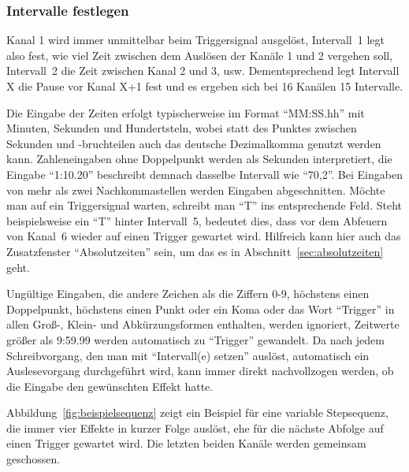 \documentclass[paper=a4, open=any, numbers=noenddot]{scrbook}
\begin{document}
				\subsubsection*{Intervalle festlegen}

					Kanal 1 wird immer unmittelbar beim Triggersignal ausgelöst, Intervall~1 legt also fest, wie viel Zeit zwischen dem Auslösen der Kanäle 1 und 2 vergehen soll, Intervall~2 die Zeit zwischen Kanal 2 und 3, usw. Dementsprechend legt Intervall X die Pause vor Kanal X+1 fest und es ergeben sich bei 16 Kanälen 15 Intervalle.

					Die Eingabe der Zeiten erfolgt typischerweise im Format \enquote{MM:SS.hh} mit Minuten, Sekunden und Hundertsteln, wobei statt des Punktes zwischen Sekunden und -bruchteilen auch das deutsche Dezimalkomma genutzt werden kann. Zahleneingaben ohne Doppelpunkt werden als Sekunden interpretiert, die Eingabe \enquote{1:10.20} beschreibt demnach dasselbe Intervall wie \enquote{70,2}. Bei Eingaben von mehr als zwei Nachkommastellen werden Eingaben abgeschnitten. Möchte man auf ein Triggersignal warten, schreibt man \enquote{T} ins entsprechende Feld. Steht beispielsweise ein \enquote{T} hinter Intervall~5, bedeutet dies, dass vor dem Abfeuern von Kanal~6 wieder auf einen Trigger gewartet wird. Hilfreich kann hier auch das Zusatzfenster \enquote{Absolutzeiten} sein, um das es in Abschnitt~\ref{sec:absolutzeiten} geht.

					Ungültige Eingaben, die andere Zeichen als die Ziffern 0-9, höchstens einen Doppelpunkt, höchstens einen Punkt oder ein Koma oder das Wort \enquote{Trigger} in allen Groß-, Klein- und Abkürzungsformen enthalten, werden ignoriert, Zeitwerte größer als 9:59.99 werden automatisch zu \enquote{Trigger} gewandelt. Da nach jedem Schreibvorgang, den man mit \enquote{Intervall(e) setzen} auslöst, automatisch ein Auslesevorgang durchgeführt wird, kann immer direkt nachvollzogen werden, ob die Eingabe den gewünschten Effekt hatte.

					Abbildung~\ref{fig:beispielsequenz} zeigt ein Beispiel für eine variable Stepsequenz, die immer vier Effekte in kurzer Folge auslöst, ehe für die nächste Abfolge auf einen Trigger gewartet wird. Die letzten beiden Kanäle werden gemeinsam geschossen.
\end{document}
